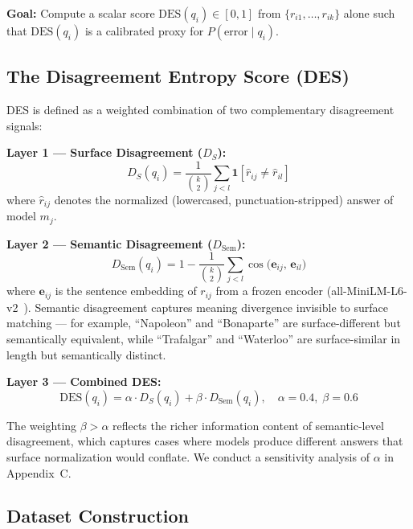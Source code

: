 \documentclass[journal]{IEEEtran}
\begin{document}
\noindent\textbf{Goal:}
Compute a scalar score $\text{DES}(q_i) \in [0, 1]$ from
$\{r_{i1}, \ldots, r_{ik}\}$ alone such that $\text{DES}(q_i)$ is a
calibrated proxy for $P(\text{error} \mid q_i)$.

\subsection{The Disagreement Entropy Score (DES)}

DES is defined as a weighted combination of two complementary disagreement
signals:

\noindent\textbf{Layer 1 --- Surface Disagreement ($D_S$):}
\begin{equation}
  D_S(q_i) = \frac{1}{\binom{k}{2}} \sum_{j < l}
    \mathbf{1}\!\left[\hat{r}_{ij} \neq \hat{r}_{il}\right]
  \label{eq:Ds}
\end{equation}
where $\hat{r}_{ij}$ denotes the normalized (lowercased,
punctuation-stripped) answer of model $m_j$.

\noindent\textbf{Layer 2 --- Semantic Disagreement ($D_\text{Sem}$):}
\begin{equation}
  D_\text{Sem}(q_i) = 1 - \frac{1}{\binom{k}{2}} \sum_{j < l}
    \cos\!\bigl(\mathbf{e}_{ij},\, \mathbf{e}_{il}\bigr)
  \label{eq:Dsem}
\end{equation}
where $\mathbf{e}_{ij}$ is the sentence embedding of $r_{ij}$ from a
frozen encoder (all-MiniLM-L6-v2~\cite{reimers2019sbert}).
Semantic disagreement captures meaning divergence invisible to surface
matching --- for example, ``Napoleon'' and ``Bonaparte'' are surface-different
but semantically equivalent, while ``Trafalgar'' and ``Waterloo'' are
surface-similar in length but semantically distinct.

\noindent\textbf{Layer 3 --- Combined DES:}
\begin{equation}
  \text{DES}(q_i) = \alpha \cdot D_S(q_i) + \beta \cdot D_\text{Sem}(q_i),
  \quad \alpha{=}0.4,\; \beta{=}0.6
  \label{eq:DES}
\end{equation}

The weighting $\beta > \alpha$ reflects the richer information content of
semantic-level disagreement, which captures cases where models produce
different answers that surface normalization would conflate.
We conduct a sensitivity analysis of $\alpha$ in Appendix~C.

\subsection{Dataset Construction}
\end{document}
